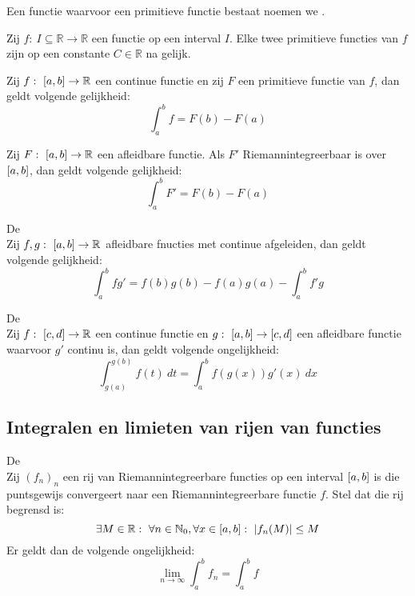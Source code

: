 \documentclass[main.tex]{subfiles}
\begin{document}
\begin{de}
  Een functie waarvoor een primitieve functie bestaat noemen we .
\end{de}

\begin{bpr}
  Zij $f:\ I \subseteq \mathbb{R}\rightarrow \mathbb{R}$ een functie op een interval $I$.
  Elke twee primitieve functies van $f$ zijn op een constante $C\in \mathbb{R}$ na gelijk.
\end{bpr}

\begin{bpr}
  Zij $f:\ \interval{a}{b} \rightarrow \mathbb{R}$ een continue functie en zij $F$ een primitieve functie van $f$, dan geldt volgende gelijkheid:
  \[ \int_{a}^{b}f = F(b) - F(a) \]
\end{bpr}

\begin{bst}
  Zij $F:\ \interval{a}{b} \rightarrow \mathbb{R}$ een afleidbare functie.
  Als $F'$ Riemannintegreerbaar is over $\interval{a}{b}$, dan geldt volgende gelijkheid:
  \[ \int_{a}^{b}F' = F(b) - F(a) \]
\end{bst}

\begin{bpr}
  De \\
  Zij $f,g:\ \interval{a}{b} \rightarrow \mathbb{R}$ afleidbare fnucties met continue afgeleiden, dan geldt volgende gelijkheid:
  \[ \int_{a}^{b}fg' = f(b)g(b)-f(a)g(a) - \int_{a}^{b}f'g \]
\end{bpr}

\begin{bpr}
  De \\
  Zij $f:\ \interval{c}{d}\rightarrow\mathbb{R}$ een continue functie en $g:\ \interval{a}{b} \rightarrow \interval{c}{d}$ een afleidbare functie waarvoor $g'$ continu is, dan geldt volgende ongelijkheid:
  \[ \int_{g(a)}^{g(b)}f(t)\ dt = \int_{a}^{b}f(g(x))g'(x)\ dx \]
\end{bpr}

\subsection{Integralen en limieten van rijen van functies}
\label{sec:integr-en-limi}

\begin{bst}
  De \\
  Zij $(f_{n})_{n}$ een rij van Riemannintegreerbare functies op een interval $\interval{a}{b}$ is die puntsgewijs convergeert naar een Riemannintegreerbare functie $f$.
  Stel dat die rij begrensd is:
  \[ \exists M\in \mathbb{R}:\ \forall n\in \mathbb{N}_{0}, \forall x\in \interval{a}{b}:\ \left|f_{n}(M)\right| \le M \]
  Er geldt dan de volgende ongelijkheid:
  \[ \lim_{n\rightarrow \infty}\int_{a}^{b}f_{n} = \int_{a}^{b}f \]
\end{bst}
\end{document}
